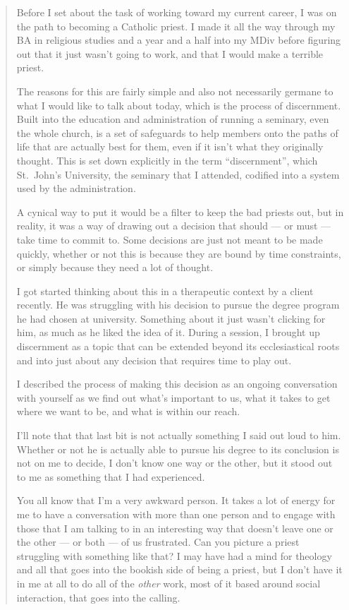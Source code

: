 \begin{quote}
Before I set about the task of working toward my current career, I was on the path to becoming a Catholic priest. I made it all the way through my BA in religious studies and a year and a half into my MDiv before figuring out that it just wasn't going to work, and that I would make a terrible priest.

The reasons for this are fairly simple and also not necessarily germane to what I would like to talk about today, which is the process of discernment. Built into the education and administration of running a seminary, even the whole church, is a set of safeguards to help members onto the paths of life that are actually best for them, even if it isn't what they originally thought. This is set down explicitly in the term ``discernment'', which St.~John's University, the seminary that I attended, codified into a system used by the administration.

A cynical way to put it would be a filter to keep the bad priests out, but in reality, it was a way of drawing out a decision that should --- or must --- take time to commit to. Some decisions are just not meant to be made quickly, whether or not this is because they are bound by time constraints, or simply because they need a lot of thought.

I got started thinking about this in a therapeutic context by a client recently. He was struggling with his decision to pursue the degree program he had chosen at university. Something about it just wasn't clicking for him, as much as he liked the idea of it. During a session, I brought up discernment as a topic that can be extended beyond its ecclesiastical roots and into just about any decision that requires time to play out.

I described the process of making this decision as an ongoing conversation with yourself as we find out what's important to us, what it takes to get where we want to be, and what is within our reach.

I'll note that that last bit is not actually something I said out loud to him. Whether or not he is actually able to pursue his degree to its conclusion is not on me to decide, I don't know one way or the other, but it stood out to me as something that I had experienced.

You all know that I'm a very awkward person. It takes a lot of energy for me to have a conversation with more than one person and to engage with those that I am talking to in an interesting way that doesn't leave one or the other --- or both --- of us frustrated. Can you picture a priest struggling with something like that? I may have had a mind for theology and all that goes into the bookish side of being a priest, but I don't have it in me at all to do all of the \emph{other} work, most of it based around social interaction, that goes into the calling.


\end{quote}
